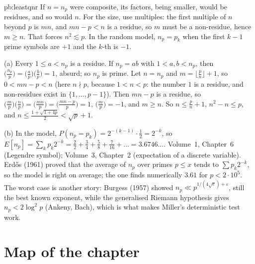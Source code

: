 \begin{solution}{pb:leastqnr}
\idea If $n=n_p$ were composite, its factors, being smaller, would be residues, and so would $n$. For the size, use multiples:
the first multiple of $n$ beyond $p$ is $mn$, and $mn-p<n$ is a residue, so $m$ must be a non-residue, hence $m\ge n$. That forces
$n^2\lesssim p$. In the random model, $n_p=p_k$ when the first $k-1$ prime symbols are $+1$ and the $k$-th is $-1$.

\writeup (a) Every $1\le a<n_p$ is a residue. If $n_p=ab$ with $1<a,b<n_p$, then $\bigl(\frac{n_p}p\bigr)=\bigl(\frac ap\bigr)\bigl(\frac bp\bigr)=1$,
absurd; so $n_p$ is prime. Let $n=n_p$ and $m=\lfloor\frac pn\rfloor+1$, so $0<mn-p<n$ (here $n\nmid p$, because $1<n<p$: the
number $1$ is a residue, and non-residues exist in $\{1,\dots,p-1\}$). Then $mn-p$ is a residue, so
$\bigl(\frac mp\bigr)\bigl(\frac np\bigr)=\bigl(\frac{mn}p\bigr)=\bigl(\frac{mn-p}p\bigr)=1$, $\bigl(\frac mp\bigr)=-1$, and $m\ge n$. So $n\le\frac pn+1$,
$n^2-n\le p$, and $n\le\frac{1+\sqrt{1+4p}}2<\sqrt p+1$.

(b) In the model, $P(n_p=p_k)=2^{-(k-1)}\cdot\frac12=2^{-k}$, so $E[n_p]=\sum_kp_k2^{-k}=\frac22+\frac34+\frac58+\frac7{16}+\dots=3.6746\ldots$.
\tools Volume~1, Chapter~6 (Legendre symbol); Volume~3, Chapter~2 (expectation of a discrete variable).
\leads Erdős (1961) proved that the average of $n_p$ over primes $p\le x$ tends to $\sum p_k2^{-k}$, so the model is right on average; the
one finds numerically $3.61$ for $p<2\cdot10^5$. The worst case is another story: Burgess (1957) showed $n_p\ll p^{1/(4\sqrt e)+\varepsilon}$, still the
best known exponent, while the generalised Riemann hypothesis gives $n_p<2\log^2p$ (Ankeny, Bach), which is what makes Miller's
deterministic test work.
\end{solution}

\section*{Map of the chapter}


